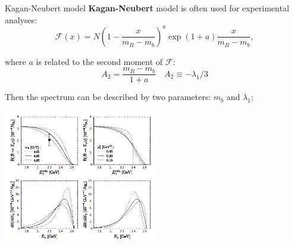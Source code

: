 \documentclass[xcolor=dvipsnames]{beamer}
\begin{document}
   \begin{frame}{Kagan-Neubert model}
      \scriptsize
      \textbf{Kagan-Neubert} model is often used for experimental analyses:
      \begin{equation}\nonumber
         \mathcal{F}(x) = N\left(1-\frac{x}{m_B-m_b}\right)^a\exp{(1+a)\frac{x}{m_B-m_b}},
     \end{equation}

     where $a$ is related to the second moment of $\mathcal{F}$:
     \begin{equation*}
      A_2 = \frac{m_B-m_b}{1+a} \quad A_2 \equiv -\lambda_1/3
     \end{equation*}


     Then the spectrum can be described by two parameters: $m_b$ and $\lambda_1$;

     \begin{center}

     \includegraphics[width=0.5\textwidth]{figures/kagan_neubert.png}
   \end{center}
   \end{frame}
\end{document}
